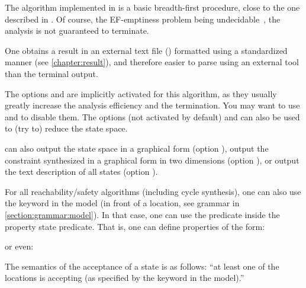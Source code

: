 The algorithm \EFsynth{} implemented in \imitator{} is a basic breadth-first procedure, close to the one described in \cite{JLR15}.
Of course, the EF-emptiness problem being undecidable~\cite{AHV93}, the analysis is not guaranteed to terminate.

%

One obtains a result in an external text file () formatted using a standardized manner (see \cref{chapter:result}), and therefore easier to parse using an external tool than the terminal output.

The options  and  are implicitly activated for this algorithm, as they usually greatly increase the analysis efficiency and the termination.
You may want to use  and  to disable them.
The options  (not activated by default) and  can also be used to (try to) reduce the state space.

\imitator{} can also
output the state space in a graphical form (option ),
output the constraint synthesized in a graphical form in two dimensions (option ),
or
output the text description of all states (option ).


\begin{remark}\label{remark:accepting}
	For all reachability/safety algorithms (including cycle synthesis), one can also use the  keyword in the model (in front of a location, see grammar in \cref{section:grammar:model}).
	In that case, one can use the  predicate inside the property state predicate.
	That is, one can define properties of the form:


	or even:


	The semantics of the acceptance of a state is as follows: ``at least one of the locations is accepting (as specified by the  keyword in the model).''

%
\end{remark}

